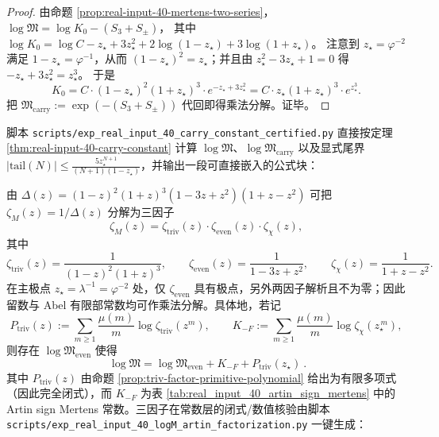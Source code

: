 \begin{proof}
由命题 \ref{prop:real-input-40-mertens-two-series}，
\(
\log\mathfrak{M}
=\log K_0-(S_3+S_\pm)
\)，
其中
\(
\log K_0=\log C-z_\star+3z_\star^2+2\log(1-z_\star)+3\log(1+z_\star)
\)。
注意到 \(z_\star=\varphi^{-2}\) 满足 \(1-z_\star=\varphi^{-1}\)，从而 \((1-z_\star)^2=z_\star\)；并且由 \(z_\star^2-3z_\star+1=0\) 得
\(
-z_\star+3z_\star^2=z_\star^3
\)。
于是
\[
K_0=C\cdot (1-z_\star)^2(1+z_\star)^3\cdot e^{-z_\star+3z_\star^2}
=C\cdot z_\star(1+z_\star)^3\cdot e^{z_\star^3}.
\]
把 \(\mathfrak{M}_{\mathrm{carry}}:=\exp(-(S_3+S_\pm))\) 代回即得乘法分解。证毕。
\end{proof}

\begin{remark}\label{rem:real-input-40-carry-constant-certified}
脚本 \texttt{scripts/exp\_real\_input\_40\_carry\_constant\_certified.py} 直接按定理 \ref{thm:real-input-40-carry-constant} 计算
\(\log\mathfrak{M}\)、\(\log\mathfrak{M}_{\mathrm{carry}}\)
以及显式尾界
\(
|\mathrm{tail}(N)|\le \frac{5 z_\star^{N+1}}{(N+1)(1-z_\star)}
\)，并输出一段可直接嵌入的公式块：

\end{remark}

\begin{remark}\label{rem:real-input-40-logM-artin-factorization}
由
\(
\Delta(z)=(1-z)^2(1+z)^3(1-3z+z^2)(1+z-z^2)
\)
可把 \(\zeta_M(z)=1/\Delta(z)\) 分解为三因子
\[
\zeta_M(z)=\zeta_{\mathrm{triv}}(z)\cdot \zeta_{\mathrm{even}}(z)\cdot \zeta_{\chi}(z),
\]
其中
\[
\zeta_{\mathrm{triv}}(z)=\frac{1}{(1-z)^2(1+z)^3},\qquad
\zeta_{\mathrm{even}}(z)=\frac{1}{1-3z+z^2},\qquad
\zeta_{\chi}(z)=\frac{1}{1+z-z^2}.
\]
在主极点 \(z_\star=\lambda^{-1}=\varphi^{-2}\) 处，仅 \(\zeta_{\mathrm{even}}\) 具有极点，另外两因子解析且不为零；因此留数与 Abel 有限部常数均可作乘法分解。具体地，若记
\[
P_{\mathrm{triv}}(z):=\sum_{m\ge 1}\frac{\mu(m)}{m}\log\zeta_{\mathrm{triv}}(z^m),\qquad
K_{-F}:=\sum_{m\ge 1}\frac{\mu(m)}{m}\log\zeta_{\chi}(z_\star^{\,m}),
\]
则存在 \(\log\mathfrak{M}_{\mathrm{even}}\) 使得
\[
\boxed{\ \log\mathfrak{M}=\log\mathfrak{M}_{\mathrm{even}}+K_{-F}+P_{\mathrm{triv}}(z_\star)\ }.
\]
其中 \(P_{\mathrm{triv}}(z)\) 由命题 \ref{prop:triv-factor-primitive-polynomial} 给出为有限多项式（因此完全闭式），而 \(K_{-F}\) 为表 \ref{tab:real_input_40_artin_sign_mertens} 中的 Artin sign Mertens 常数。三因子在常数层的闭式/数值核验由脚本 \texttt{scripts/exp\_real\_input\_40\_logM\_artin\_factorization.py} 一键生成：


\end{remark}

